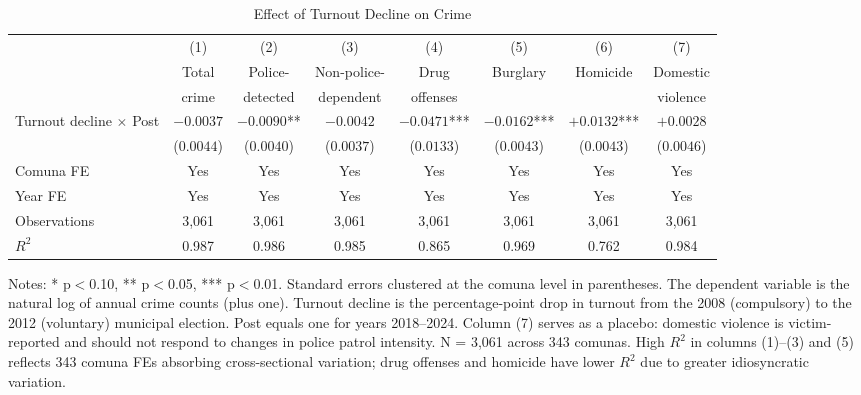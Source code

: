 \begin{table}[H]
\centering
\caption{Effect of Turnout Decline on Crime}
\begin{adjustbox}{max width=\textwidth}
\begin{threeparttable}
\begin{tabular}{lccccccc}
\toprule
& (1) & (2) & (3) & (4) & (5) & (6) & (7) \\
& Total & Police- & Non-police- & Drug & Burglary & Homicide & Domestic \\
& crime & detected & dependent & offenses & & & violence \\
\midrule
Turnout decline $\times$ Post & $-0.0037$ & $-0.0090$** & $-0.0042$ & $-0.0471$*** & $-0.0162$*** & $+0.0132$*** & $+0.0028$ \\
                         & ($0.0044$) & ($0.0040$) & ($0.0037$) & ($0.0133$) & ($0.0043$) & ($0.0043$) & ($0.0046$) \\
\midrule
Comuna FE & Yes & Yes & Yes & Yes & Yes & Yes & Yes \\
Year FE & Yes & Yes & Yes & Yes & Yes & Yes & Yes \\
Observations & 3,061 & 3,061 & 3,061 & 3,061 & 3,061 & 3,061 & 3,061 \\
$R^2$ & 0.987 & 0.986 & 0.985 & 0.865 & 0.969 & 0.762 & 0.984 \\
\bottomrule
\end{tabular}
\begin{tablenotes}[flushleft]
\footnotesize
\item Notes: * p$<$0.10, ** p$<$0.05, *** p$<$0.01. Standard errors clustered at the comuna level in parentheses. The dependent variable is the natural log of annual crime counts (plus one). Turnout decline is the percentage-point drop in turnout from the 2008 (compulsory) to the 2012 (voluntary) municipal election. Post equals one for years 2018--2024. Column (7) serves as a placebo: domestic violence is victim-reported and should not respond to changes in police patrol intensity. N = 3,061 across 343 comunas. High $R^2$ in columns (1)--(3) and (5) reflects 343 comuna FEs absorbing cross-sectional variation; drug offenses and homicide have lower $R^2$ due to greater idiosyncratic variation.
\end{tablenotes}
\end{threeparttable}
\end{adjustbox}
\label{tab:main}
\end{table}
